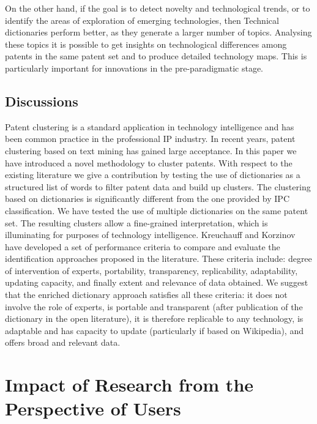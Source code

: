 \documentclass[]{book}
\begin{document}
On the other hand, if the goal is to detect novelty and technological
trends, or to identify the areas of exploration of emerging
technologies, then Technical dictionaries perform better, as they
generate a larger number of topics. Analysing these topics it is
possible to get insights on technological differences among patents in
the same patent set and to produce detailed technology maps. This is
particularly important for innovations in the pre-paradigmatic stage.

\section{Discussions}\label{discussions}

Patent clustering is a standard application in technology intelligence
and has been common practice in the professional IP industry. In recent
years, patent clustering based on text mining has gained large
acceptance. In this paper we have introduced a novel methodology to
cluster patents. With respect to the existing literature we give a
contribution by testing the use of dictionaries as a structured list of
words to filter patent data and build up clusters. The clustering based
on dictionaries is significantly different from the one provided by IPC
classification. We have tested the use of multiple dictionaries on the
same patent set. The resulting clusters allow a fine-grained
interpretation, which is illuminating for purposes of technology
intelligence. Kreuchauff and Korzinov \citep{kreuchauff2017patent} have
developed a set of performance criteria to compare and evaluate the
identification approaches proposed in the literature. These criteria
include: degree of intervention of experts, portability, transparency,
replicability, adaptability, updating capacity, and finally extent and
relevance of data obtained. We suggest that the enriched dictionary
approach satisfies all these criteria: it does not involve the role of
experts, is portable and transparent (after publication of the
dictionary in the open literature), it is therefore replicable to any
technology, is adaptable and has capacity to update (particularly if
based on Wikipedia), and offers broad and relevant data.

\chapter{Impact of Research from the Perspective of
Users}\label{impact-of-research-from-the-perspective-of-users}
\end{document}
